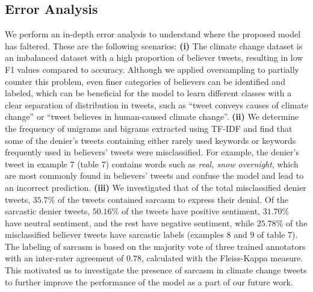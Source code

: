 \documentclass[letterpaper]{article}
\begin{document}
\subsection{{Error Analysis}} \label{Error_analysis}
We perform an in-depth error analysis to understand where the proposed model has faltered. These are the following scenarios: \textbf{(i)} The climate change dataset is an imbalanced dataset with a high proportion of believer tweets, resulting in low F1 values compared to accuracy. Although we applied oversampling to partially counter this problem, even finer categories of believers can be identified and labeled, which can be beneficial for the model to learn different classes with a clear separation of distribution in tweets, such as ``tweet conveys causes of climate change'' or ``tweet believes in human-caused climate change''. \textbf{(ii)} We determine the frequency of unigrams and bigrams extracted using TF-IDF and find that some of the denier's tweets containing either rarely used keywords or keywords frequently used in believers' tweets were misclassified. For example, the denier's tweet in example $7$ (table 7) contains words such as \textit{real, snow overnight}, which are most commonly found in believers' tweets and confuse the model and lead to an incorrect prediction. \textbf{(iii)} We investigated that of the total misclassified denier tweets, $35.7\%$ of the tweets contained sarcasm to express their denial. Of the sarcastic denier tweets, $50.16\%$ of the tweets have positive sentiment, $31.70\%$ have neutral sentiment, and the rest have negative sentiment, while $25.78\%$ of the misclassified believer tweets have sarcastic labels (examples $8$ and $9$ of table 7). The labeling of sarcasm is based on the majority vote of three trained annotators with an inter-rater agreement of $0.78$, calculated with the Fleiss-Kappa measure. This motivated us to investigate the presence of sarcasm in climate change tweets to further improve the performance of the model as a part of our future work. %
\end{document}
